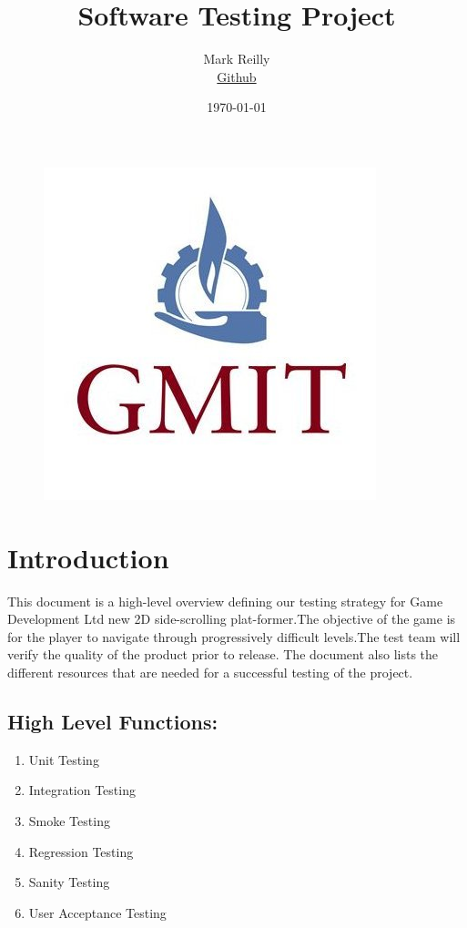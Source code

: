 \documentclass{article}
\title{Software Testing Project}
\author{
  Mark Reilly\\
  \href{https://github.com/MarkReillyGMIT}{Github}
}
\date{\today}
\begin{document}
\begin{figure}
    \centering
    \includegraphics[scale=0.3]{./images/gmit.jpg}
\end{figure}

\maketitle


\tableofcontents
\newpage


\section{Introduction}
This document is a high-level overview defining our testing strategy for Game Development Ltd  new 2D side-scrolling plat-former.The 
objective of the game is for the player to navigate through progressively difficult levels.The test team will verify the quality of the product prior to release. The document also lists the different resources that are needed for a successful testing of the project.

\subsection{High Level Functions:}
\begin{enumerate}
    \item Unit Testing
    \item Integration Testing
    \item Smoke  Testing
    \item Regression  Testing
    \item Sanity  Testing
    \item User Acceptance Testing
\end{enumerate}
\end{document}
